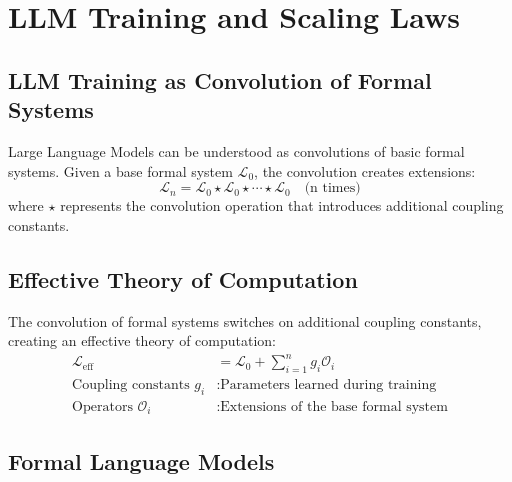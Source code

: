 
\section{LLM Training and Scaling Laws}

\subsection{LLM Training as Convolution of Formal Systems}

\begin{definition}
\label{def:convolution-formal}
Large Language Models can be understood as convolutions of basic formal systems. Given a base formal system $\mathcal{L}_0$, the convolution creates extensions:
\[
\mathcal{L}_n = \mathcal{L}_0 \star \mathcal{L}_0 \star \cdots \star \mathcal{L}_0 \quad \text{(n times)}
\]
where $\star$ represents the convolution operation that introduces additional coupling constants.
\end{definition}

\subsection{Effective Theory of Computation}

\begin{definition}
\label{def:effective-computation}
The convolution of formal systems switches on additional coupling constants, creating an effective theory of computation:
\begin{align}
\mathcal{L}_{\text{eff}} &= \mathcal{L}_0 + \sum_{i=1}^n g_i \mathcal{O}_i \\
\text{Coupling constants } g_i &: \text{Parameters learned during training} \\
\text{Operators } \mathcal{O}_i &: \text{Extensions of the base formal system}
\end{align}
\end{definition}

\subsection{Formal Language Models}

